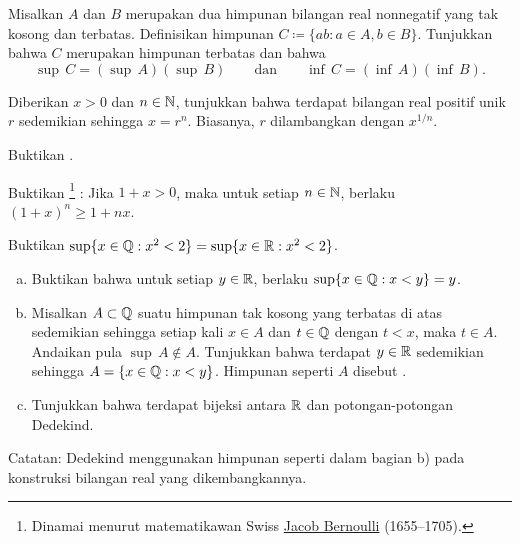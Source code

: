 \begin{exercise}
Misalkan $A$ dan $B$ merupakan dua himpunan bilangan real nonnegatif yang tak kosong dan terbatas.
Definisikan himpunan
$C \coloneqq \{ ab : a \in A, b \in B \}$.
Tunjukkan bahwa $C$ merupakan himpunan terbatas dan bahwa
\begin{equation*}
\sup\,C = (\sup\,A )( \sup\,B)
\qquad \text{dan} \qquad
\inf\,C = (\inf\,A )( \inf\,B).
\end{equation*}
\end{exercise}

\begin{exercise}[Sulit] \label{exercise:rootexistshard}
Diberikan $x > 0$ dan $n \in {\mathbb{N}}$, tunjukkan bahwa terdapat bilangan real positif unik
$r$ sedemikian sehingga $x = r^n$.  Biasanya, $r$ dilambangkan dengan $x^{1/n}$.
\end{exercise}

\begin{exercise}[Mudah]
Buktikan .
\end{exercise}

\begin{exercise} \label{exercise:bernoulliineq}
Buktikan \emph{}%
\footnote{%
Dinamai menurut matematikawan Swiss
\href{https://en.wikipedia.org/wiki/Jacob_Bernoulli}{Jacob Bernoulli}
(1655--1705).}%
: Jika $1+x > 0$, maka
untuk setiap $n \in {\mathbb{N}}$, berlaku $(1+x)^n \geq 1+nx$.
\end{exercise}

\begin{exercise} \label{exercise:sqrt2QorR}
Buktikan $\sup \{ x \in {\mathbb{Q}} : x^2 < 2 \} = \sup \{ x \in {\mathbb{R}} : x^2 < 2 \}$.
\end{exercise}

\begin{exercise} \label{exercise:Dedekind}
\leavevmode
\begin{enumerate}[a)]
\item
Buktikan bahwa untuk setiap $y \in {\mathbb{R}}$, berlaku $\sup \{ x \in {\mathbb{Q}} : x < y \} = y$.
\item
Misalkan $A \subset {\mathbb{Q}}$ suatu himpunan tak kosong yang terbatas di atas sedemikian sehingga setiap kali $x
\in A$ dan $t \in {\mathbb{Q}}$ dengan $t < x$, maka $t \in A$.  Andaikan pula
$\sup\, A \notin A$.  Tunjukkan bahwa terdapat $y \in {\mathbb{R}}$ sedemikian sehingga
$A = \{ x \in {\mathbb{Q}} : x < y \}$.  Himpunan seperti $A$ disebut
\emph{}.
\item
Tunjukkan bahwa terdapat bijeksi antara ${\mathbb{R}}$ dan potongan-potongan Dedekind.
\end{enumerate}
Catatan: Dedekind menggunakan himpunan seperti dalam bagian b) pada konstruksi
bilangan real yang dikembangkannya.
\end{exercise}

